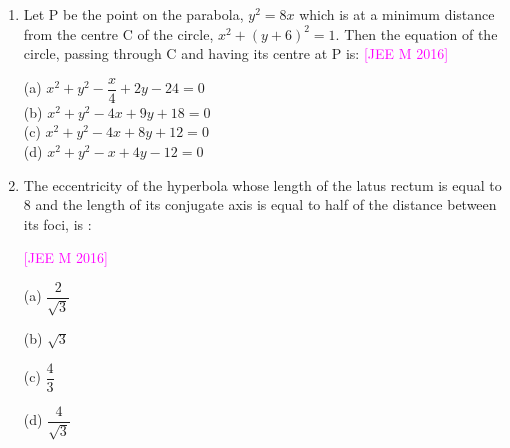 \documentclass[journal,12pt,twocolumn]{IEEEtran}
\theoremstyle{remark}
\newcommand{\questionA}[6]{
\item #1
    \textcolor{magenta}{[#2]}
    
    (a) #3\\
    (b) #4\\
    (c) #5\\
    (d) #6\\
}
\newcommand{\questionC}[6]{
\item #1
    \begin{flushright}
        {\textcolor{magenta}{[#2]}}
    \end{flushright}
    \begin{multicols}{4}
        (a) #3
        
        (b) #4
        
        (c) #5
        
        (d) #6
    \end{multicols}
}
\begin{document}
\begin{enumerate}[label=\textcolor{magenta}{\arabic*.}]
\questionA{Let P be the point on the parabola, $y^2=8x$ which is at a minimum distance from the centre C of the circle, $x^2+(y+6)^2=1$. Then the equation of the circle, passing through C and having its centre at P is:}{JEE M 2016}
{$x^2+y^2-\dfrac{x}{4}+2y-24=0$}
{$x^2+y^2-4x+9y+18=0$}
{$x^2+y^2-4x+8y+12=0$}
{$x^2+y^2-x+4y-12=0$}

\questionC{The eccentricity of the hyperbola whose length of the latus rectum is equal to 8 and the length of its conjugate axis is equal to half of the distance between its foci, is :}{JEE M 2016}
{$\dfrac{2}{\sqrt{3}}$}
{$\sqrt{3}$}
{$\dfrac{4}{3}$}
{$\dfrac{4}{\sqrt{3}}$}

\end{enumerate}
\end{document}
